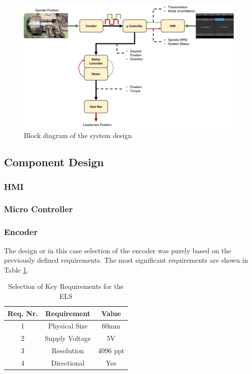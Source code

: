 \begin{figure}
    \begin{center}
    \includegraphics[width=12cm]{Pictures/SystemDesign.png}
    \caption[Block diagram of the system design]{Block diagram of the system design}
    \label{System design}
    \end{center}
\end{figure}


\subsection{Component Design}
\subsubsection{HMI}
\subsubsection{Micro Controller}
\subsubsection{Encoder}
The design or in this case selection of the encoder was purely based on the previously defined requirements. The most significant requirements are shown in Table \ref{Tab Encoder Key Requirements}.

\begin{table}
    \centering
     \begin{tabular}{||c|c|c||} 
        \hline
        Req. Nr. & Requirement & Value\\ [0.5ex] 
        \hline\hline
        1 & Physical Size       & 60mm		\\ 
        2 & Supply Voltage      & 5V        \\
        3 & Resolution          & 4096 ppt  \\
        4 & Directional         & Yes       \\[1ex] 
        \hline
     \end{tabular}
     \caption{Selection of Key Requirements for the ELS}
     \label{Tab Encoder Key Requirements}
\end{table}

